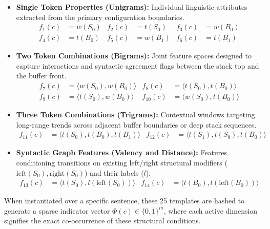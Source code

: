 \documentclass[12pt,a4paper]{article}
\begin{document}
\begin{itemize}
    \item \textbf{Single Token Properties (Unigrams):} Individual linguistic attributes extracted from the primary configuration boundaries.
    \begin{align*}
        f_1(c) &= w(S_0) & f_2(c) &= t(S_0) & f_3(c) &= w(B_0) \\
        f_4(c) &= t(B_0) & f_5(c) &= w(B_1) & f_6(c) &= t(B_1)
    \end{align*}
    
    \item \textbf{Two Token Combinations (Bigrams):} Joint feature spaces designed to capture interactions and syntactic agreement flags between the stack top and the buffer front.
    \begin{align*}
        f_7(c) &= \langle w(S_0), w(B_0) \rangle & f_8(c) &= \langle t(S_0), t(B_0) \rangle \\
        f_9(c) &= \langle t(S_0), w(B_0) \rangle & f_{10}(c) &= \langle w(S_0), t(B_0) \rangle
    \end{align*}
    
    \item \textbf{Three Token Combinations (Trigrams):} Contextual windows targeting long-range trends across adjacent buffer boundaries or deep stack sequences.
    \begin{align*}
        f_{11}(c) &= \langle t(S_0), t(B_0), t(B_1) \rangle & f_{12}(c) &= \langle t(S_1), t(S_0), t(B_0) \rangle
    \end{align*}
    
    \item \textbf{Syntactic Graph Features (Valency and Distance):} Features conditioning transitions on existing left/right structural modifiers ($\text{left}(S_0), \text{right}(S_0)$) and their labels ($l$).
    \begin{align*}
        f_{13}(c) &= \langle t(S_0), l(\text{left}(S_0)) \rangle & f_{14}(c) &= \langle t(B_0), l(\text{left}(B_0)) \rangle
    \end{align*}
\end{itemize}

When instantiated over a specific sentence, these 25 templates are hashed to generate a sparse indicator vector $\Phi(c) \in \{0, 1\}^m$, where each active dimension signifies the exact co-occurrence of these structural conditions.
\end{document}
